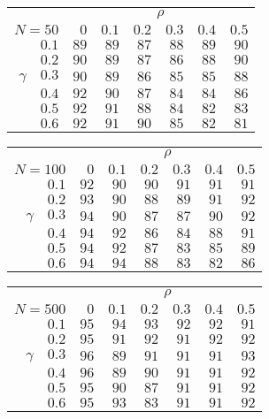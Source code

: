 \begin{tabular}{r|rrrrrr}
\hline\hline
 &\multicolumn{6}{c}{$\rho$} \\ 
 $N = 50$ & $0$ & $0.1$ & $0.2$ & $0.3$ & $0.4$ & $0.5$ \\ 
 \hline$0.1$ & $89$ & $89$ & $87$ & $88$ & $89$ & $90$\\ 
$0.2$ & $90$ & $89$ & $87$ & $86$ & $88$ & $90$\\ 
$\gamma\quad$$0.3$ & $90$ & $89$ & $86$ & $85$ & $85$ & $88$\\ 
$0.4$ & $92$ & $90$ & $87$ & $84$ & $84$ & $86$\\ 
$0.5$ & $92$ & $91$ & $88$ & $84$ & $82$ & $83$\\ 
$0.6$ & $92$ & $91$ & $90$ & $85$ & $82$ & $81$\\ 
 \hline 
 \end{tabular}
 
 \vspace{2em} 
 
\begin{tabular}{r|rrrrrr}
\hline\hline
 &\multicolumn{6}{c}{$\rho$} \\ 
 $N = 100$ & $0$ & $0.1$ & $0.2$ & $0.3$ & $0.4$ & $0.5$ \\ 
 \hline$0.1$ & $92$ & $90$ & $90$ & $91$ & $91$ & $91$\\ 
$0.2$ & $93$ & $90$ & $88$ & $89$ & $91$ & $92$\\ 
$\gamma\quad$$0.3$ & $94$ & $90$ & $87$ & $87$ & $90$ & $92$\\ 
$0.4$ & $94$ & $92$ & $86$ & $84$ & $88$ & $91$\\ 
$0.5$ & $94$ & $92$ & $87$ & $83$ & $85$ & $89$\\ 
$0.6$ & $94$ & $94$ & $88$ & $83$ & $82$ & $86$\\ 
 \hline 
 \end{tabular}
 
 \vspace{2em} 
 
\begin{tabular}{r|rrrrrr}
\hline\hline
 &\multicolumn{6}{c}{$\rho$} \\ 
 $N = 500$ & $0$ & $0.1$ & $0.2$ & $0.3$ & $0.4$ & $0.5$ \\ 
 \hline$0.1$ & $95$ & $94$ & $93$ & $92$ & $92$ & $91$\\ 
$0.2$ & $95$ & $91$ & $92$ & $91$ & $92$ & $92$\\ 
$\gamma\quad$$0.3$ & $96$ & $89$ & $91$ & $91$ & $91$ & $93$\\ 
$0.4$ & $96$ & $89$ & $90$ & $91$ & $91$ & $92$\\ 
$0.5$ & $95$ & $90$ & $87$ & $91$ & $91$ & $92$\\ 
$0.6$ & $95$ & $93$ & $83$ & $91$ & $91$ & $92$\\ 
 \hline 
 \end{tabular}